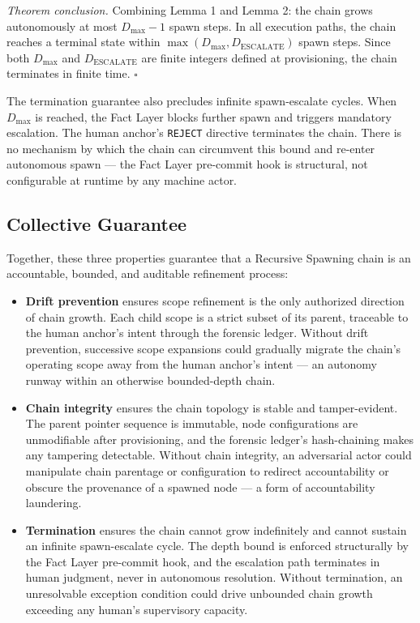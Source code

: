 \medskip
\textit{Theorem conclusion.}
Combining Lemma 1 and Lemma 2: the chain grows autonomously at most $D_{\mathrm{max}} - 1$ spawn steps. In all execution paths, the chain reaches a terminal state within $\max(D_{\mathrm{max}}, D_{\mathrm{ESCALATE}})$ spawn steps. Since both $D_{\mathrm{max}}$ and $D_{\mathrm{ESCALATE}}$ are finite integers defined at provisioning, the chain terminates in finite time. $\square$

The termination guarantee also precludes infinite spawn-escalate cycles. When $D_{\mathrm{max}}$ is reached, the Fact Layer blocks further spawn and triggers mandatory escalation. The human anchor's \texttt{REJECT} directive terminates the chain. There is no mechanism by which the chain can circumvent this bound and re-enter autonomous spawn — the Fact Layer pre-commit hook is structural, not configurable at runtime by any machine actor.

\subsection{Collective Guarantee}
\label{sec:rs-collective-guarantee}

Together, these three properties guarantee that a Recursive Spawning chain is an accountable, bounded, and auditable refinement process:

\begin{itemize}
  \item \textbf{Drift prevention} ensures scope refinement is the only authorized direction of chain growth. Each child scope is a strict subset of its parent, traceable to the human anchor's intent through the forensic ledger. Without drift prevention, successive scope expansions could gradually migrate the chain's operating scope away from the human anchor's intent — an autonomy runway within an otherwise bounded-depth chain.
  \item \textbf{Chain integrity} ensures the chain topology is stable and tamper-evident. The parent pointer sequence is immutable, node configurations are unmodifiable after provisioning, and the forensic ledger's hash-chaining makes any tampering detectable. Without chain integrity, an adversarial actor could manipulate chain parentage or configuration to redirect accountability or obscure the provenance of a spawned node — a form of accountability laundering.
  \item \textbf{Termination} ensures the chain cannot grow indefinitely and cannot sustain an infinite spawn-escalate cycle. The depth bound is enforced structurally by the Fact Layer pre-commit hook, and the escalation path terminates in human judgment, never in autonomous resolution. Without termination, an unresolvable exception condition could drive unbounded chain growth exceeding any human's supervisory capacity.
\end{itemize}

